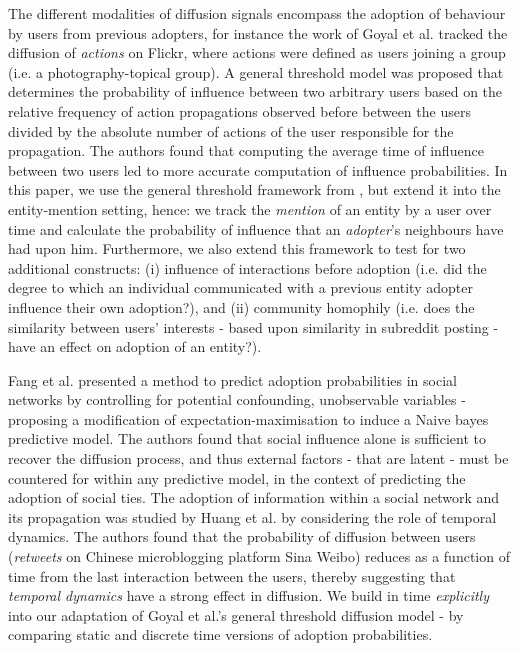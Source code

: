 \documentclass[journal,10pt,draftclsnofoot,onecolumn]{IEEEtran}
\begin{document}
The different modalities of diffusion signals encompass the adoption of behaviour by users from previous adopters, for instance the work of Goyal et al. \cite{goyal2010learning} tracked the diffusion of \emph{actions} on Flickr, where actions were defined as users joining a group (i.e. a photography-topical group).
A general threshold model was proposed that determines the probability of influence between two arbitrary users based on the relative frequency of action propagations observed before between the users divided by the absolute number of actions of the user responsible for the propagation.
The authors found that computing the average time of influence between two users led to more accurate computation of influence probabilities.
In this paper, we use the general threshold framework from \cite{goyal2010learning}, but extend it into the entity-mention setting, hence: we track the \emph{mention} of an entity by a user over time and calculate the probability of influence that an \emph{adopter}'s neighbours have had upon him.
Furthermore, we also extend this framework to test for two additional constructs: (i) influence of interactions before adoption (i.e. did the degree to which an individual communicated with a previous entity adopter influence their own adoption?), and (ii) community homophily (i.e. does the similarity between users' interests - based upon similarity in subreddit posting - have an effect on adoption of an entity?).

Fang et al. \cite{fang2013predicting} presented a method to predict adoption probabilities in social networks by controlling for potential confounding, unobservable variables - proposing a modification of expectation-maximisation to induce a Naive bayes predictive model.
The authors found that social influence alone is sufficient to recover the diffusion process, and thus external factors - that are latent - must be countered for within any predictive model, in the context of predicting the adoption of social ties.
The adoption of information within a social network and its propagation was studied by Huang et al. \cite{huang2014temporal} by considering the role of temporal dynamics.
The authors found that the probability of diffusion between users (\emph{retweets} on Chinese microblogging platform Sina Weibo) reduces as a function of time from the last interaction between the users, thereby suggesting that \emph{temporal dynamics} have a strong effect in diffusion.
We build in time \emph{explicitly} into our adaptation of Goyal et al.'s \cite{goyal2010learning} general threshold diffusion model - by comparing static and discrete time versions of adoption probabilities.
\end{document}
